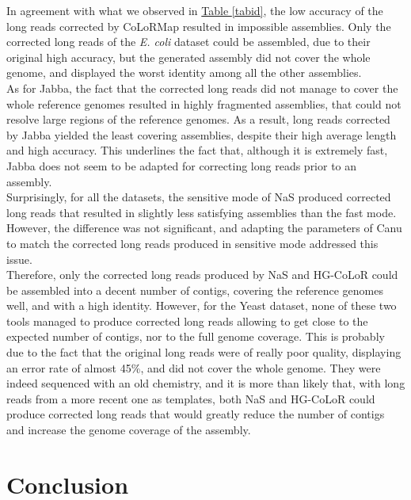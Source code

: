 \documentclass[long, final]{jobim2017}
\begin{document}
In agreement with what we observed in \hyperref[tabid]{Table \ref*{tabid}}, the low accuracy of the long reads corrected by CoLoRMap resulted in impossible assemblies. Only the corrected long reads of the \emph{E. coli} dataset could be assembled, due to their original high accuracy, but the generated assembly did not cover the whole genome, and displayed the worst identity among all the other assemblies. \\
\indent As for Jabba, the fact that the corrected long reads did not manage to cover the whole reference genomes resulted in highly fragmented assemblies, that could not resolve large regions of the reference genomes. As a result, long reads corrected by Jabba yielded the least covering assemblies, despite their high average length and high accuracy. This underlines the fact that, although it is extremely fast, Jabba does not seem to be adapted for correcting long reads prior to an assembly. \\
\indent Surprisingly, for all the datasets, the sensitive mode of NaS produced corrected long reads that resulted in slightly less satisfying assemblies than the fast mode. However, the difference was not significant, and adapting the parameters of Canu to match the corrected long reads produced in sensitive mode addressed this issue. \\
\indent Therefore, only the corrected long reads produced by NaS and HG-CoLoR could be assembled into a decent number of contigs, covering the reference genomes well, and with a high identity. However, for the Yeast dataset, none of these two tools managed to produce corrected long reads allowing to get close to the expected number of contigs, nor to the full genome coverage. This is probably due to the fact that the original long reads were of really poor quality, displaying an error rate of almost 45\%, and did not cover the whole genome. They were indeed sequenced with an old chemistry, and it is more than likely that, with long reads from a more recent one as templates, both NaS and HG-CoLoR could produce corrected long reads that would greatly reduce the number of contigs and increase the genome coverage of the assembly. \\

\section{Conclusion}
\label{sec:conclusion}
\end{document}
